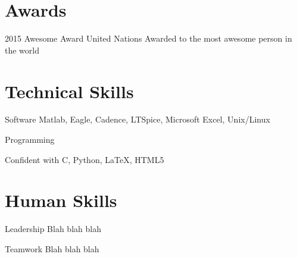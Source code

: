 \documentclass[a4paper,english]{friggeri-cv} %
\begin{document}
\section{Awards}

\begin{entrylist}


\entry
{2015}
{Awesome Award}
{United Nations} 
{} 
{Awarded to the most awesome person in the world}



\end{entrylist}


\section{Technical Skills}

\begin{entrylist}




\entry
{}
{Software}
{}
{}
{
Matlab, Eagle, Cadence, LTSpice, Microsoft Excel, Unix/Linux
}



\entry
{}
{Programming}
{}
{}
{
Confident with C, Python, \LaTeX, HTML5

}




\end{entrylist}




\section{Human Skills}

\begin{entrylist}




\entry
{}
{Leadership}
{}
{}
{
Blah blah blah
}



\entry
{}
{Teamwork}
{}
{}
{
Blah blah blah
}




\end{entrylist}
\end{document}
